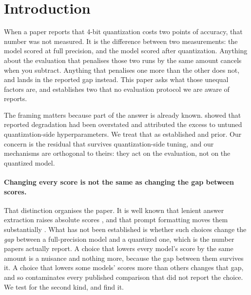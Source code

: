 \documentclass[conference]{IEEEtran}
\begin{document}
\section{Introduction}
\label{sec:intro}

When a paper reports that 4-bit quantization costs two points of accuracy, that number
was not measured. It is the difference between two measurements: the model scored at
full precision, and the model scored after quantization. Anything about the evaluation
that penalises those two runs by the same amount cancels when you subtract. Anything
that penalises one more than the other does not, and lands in the reported gap instead.
This paper asks what those unequal factors are, and establishes two that no evaluation
protocol we are aware of reports.

The framing matters because part of the answer is already known. \citet{kurtic2025bf16}
showed that reported degradation had been overstated and attributed the excess to
untuned quantization-side hyperparameters. We treat that as established and prior.
Our concern is the residual that survives quantization-side tuning, and our
mechanisms are orthogonal to theirs: they act on the evaluation, not on the
quantized model.

\paragraph{Changing every score is not the same as changing the gap between scores.}
That distinction organises the paper. It is well known that lenient answer
extraction raises absolute scores \citep{jo2025finding,yu2025xfinder}, and that
prompt formatting moves them substantially \citep{sclar2024formatspread}. What has
not been established is whether such choices change the \emph{gap} between a
full-precision model and a quantized one, which is the number papers actually report. A choice that lowers
every model's score by the same amount is a nuisance and nothing more, because the gap
between them survives it. A choice that lowers some models' scores more than others
changes that gap, and so contaminates every published comparison that did not report
the choice. We test for the second kind, and find it.
\end{document}
